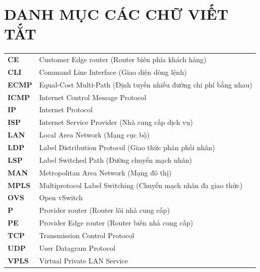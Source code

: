 \section*{DANH MỤC CÁC CHỮ VIẾT TẮT}
 {}

\begin{longtable}{l p{12cm}}
    \textbf{CE} & Customer Edge router (Router biên phía khách hàng) \\
    \textbf{CLI} & Command Line Interface (Giao diện dòng lệnh) \\
    \textbf{ECMP} & Equal-Cost Multi-Path (Định tuyến nhiều đường chi phí bằng nhau) \\
    \textbf{ICMP} & Internet Control Message Protocol \\
    \textbf{IP} & Internet Protocol \\
    \textbf{ISP} & Internet Service Provider (Nhà cung cấp dịch vụ) \\
    \textbf{LAN} & Local Area Network (Mạng cục bộ) \\
    \textbf{LDP} & Label Distribution Protocol (Giao thức phân phối nhãn) \\
    \textbf{LSP} & Label Switched Path (Đường chuyển mạch nhãn) \\
    \textbf{MAN} & Metropolitan Area Network (Mạng đô thị) \\
    \textbf{MPLS} & Multiprotocol Label Switching (Chuyển mạch nhãn đa giao thức) \\
    \textbf{OVS} & Open vSwitch \\
    \textbf{P} & Provider router (Router lõi nhà cung cấp) \\
    \textbf{PE} & Provider Edge router (Router biên nhà cung cấp) \\
    \textbf{TCP} & Transmission Control Protocol \\
    \textbf{UDP} & User Datagram Protocol \\
    \textbf{VPLS} & Virtual Private LAN Service \\
\end{longtable}

\newpage

